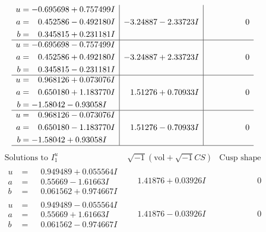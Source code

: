 \documentclass[1p]{elsarticle_modified}
\theoremstyle{definition}
\newcommand{\I}{\sqrt{-1}}
\begin{document}
$$\begin{array}{c|c|c}
\begin{aligned}
u &= -0.695698 + 0.757499 I \\
a &= \phantom{-}0.452586 - 0.492180 I \\
b &= \phantom{-}0.345815 + 0.231181 I\end{aligned}
 & -3.24887 - 2.33723 I & \phantom{-0.000000 } 0 \\ \hline\begin{aligned}
u &= -0.695698 - 0.757499 I \\
a &= \phantom{-}0.452586 + 0.492180 I \\
b &= \phantom{-}0.345815 - 0.231181 I\end{aligned}
 & -3.24887 + 2.33723 I & \phantom{-0.000000 } 0 \\ \hline\begin{aligned}
u &= \phantom{-}0.968126 + 0.073076 I \\
a &= \phantom{-}0.650180 + 1.183770 I \\
b &= -1.58042 - 0.93058 I\end{aligned}
 & \phantom{-}1.51276 + 0.70933 I & \phantom{-0.000000 } 0 \\ \hline\begin{aligned}
u &= \phantom{-}0.968126 - 0.073076 I \\
a &= \phantom{-}0.650180 - 1.183770 I \\
b &= -1.58042 + 0.93058 I\end{aligned}
 & \phantom{-}1.51276 - 0.70933 I & \phantom{-0.000000 } 0\\
 \hline 
 \end{array}$$\newpage$$\begin{array}{c|c|c}  
\text{Solutions to }I^u_{1}& \I (\text{vol} + \sqrt{-1}CS) & \text{Cusp shape}\\
 \hline 
\begin{aligned}
u &= \phantom{-}0.949489 + 0.055564 I \\
a &= \phantom{-}0.55669 - 1.61663 I \\
b &= \phantom{-}0.061562 + 0.974667 I\end{aligned}
 & \phantom{-}1.41876 + 0.03926 I & \phantom{-0.000000 } 0 \\ \hline\begin{aligned}
u &= \phantom{-}0.949489 - 0.055564 I \\
a &= \phantom{-}0.55669 + 1.61663 I \\
b &= \phantom{-}0.061562 - 0.974667 I\end{aligned}
 & \phantom{-}1.41876 - 0.03926 I & \phantom{-0.000000 } 0 \\ \hline\begin{aligned}

\end{aligned}
\end{array}$$
\end{document}
